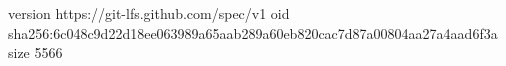 version https://git-lfs.github.com/spec/v1
oid sha256:6c048c9d22d18ee063989a65aab289a60eb820cac7d87a00804aa27a4aad6f3a
size 5566
